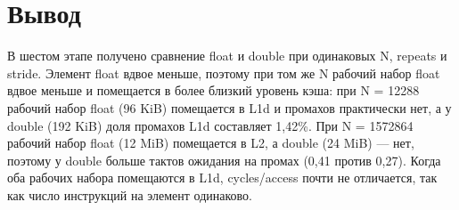 \section{Вывод}

В шестом этапе получено сравнение float и double при одинаковых N, repeats и stride.
Элемент float вдвое меньше, поэтому при том же N рабочий набор float вдвое меньше и помещается в более близкий уровень кэша: при N = 12288 рабочий набор float (96 KiB) помещается в L1d и промахов практически нет, а у double (192 KiB) доля промахов L1d составляет 1,42\%.
При N = 1572864 рабочий набор float (12 MiB) помещается в L2, а double (24 MiB) --- нет, поэтому у double больше тактов ожидания на промах (0,41 против 0,27).
Когда оба рабочих набора помещаются в L1d, cycles/access почти не отличается, так как число инструкций на элемент одинаково.
